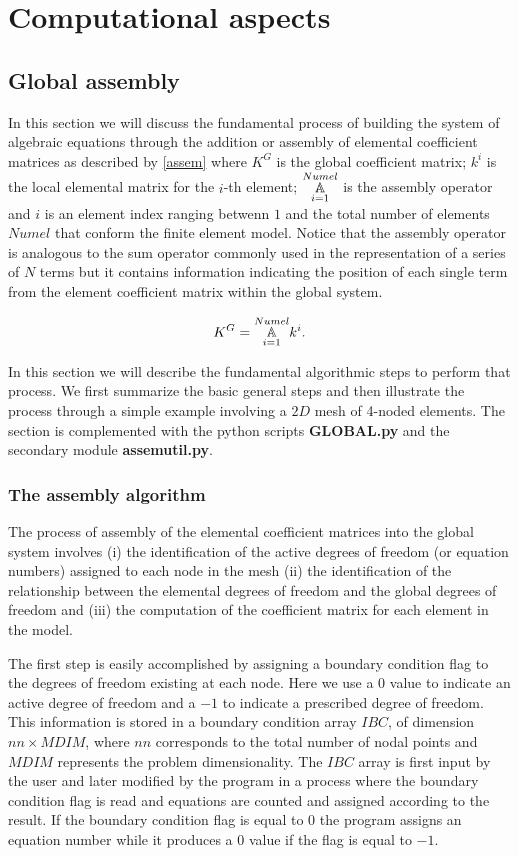 %
\graphicspath{ {./img/COMPU/} }
\chapter{Computational aspects}
\section{Global assembly}
In this section we will discuss the fundamental process of building the system of algebraic equations through the addition or assembly of elemental coefficient matrices as described by \cref{assem} where $K^G$ is the global coefficient matrix; $k^i$ is the local elemental matrix for the $i$-th element; $\assem{i=1}{Numel}$ is the assembly operator and $i$ is an element index ranging betwenn $1$ and the total number of elements $Numel$ that conform the finite element model. Notice that the assembly operator is analogous to the sum operator commonly used in the representation of a series of $N$ terms but it contains information indicating the position of each single term from the element coefficient matrix within the global system. 

\begin{equation}
{K^G}=\assem{i=1}{Numel} k^i.
\label{assem}
\end{equation}

In this section we will describe the fundamental algorithmic steps to perform that process. We first summarize the basic general steps and then illustrate the process through a simple example involving a $2D$ mesh of 4-noded elements. The section is complemented with the python scripts {\bf GLOBAL.py} and the secondary module {\bf assemutil.py}.

\subsection*{The assembly algorithm}
The process of assembly of the elemental coefficient matrices into the global system involves (i) the identification of the active degrees of freedom (or equation numbers) assigned to each node in the mesh (ii) the identification of the relationship between the elemental degrees of freedom and the global degrees of freedom and (iii) the computation of the coefficient matrix for each element in the model.

The first step is easily accomplished by assigning a boundary condition flag to the degrees of freedom existing at each node. Here we use a $0$ value to indicate an active degree of freedom and a $-1$ to indicate a prescribed degree of freedom. This information is stored in a boundary condition array $IBC$, of dimension $nn \times MDIM$, where $nn$ corresponds to the  total number of nodal points and $MDIM$ represents the problem dimensionality. The $IBC$ array is first input by the user and later modified by the program in a process where the boundary condition flag is read and equations are counted and assigned according to the result. If the boundary condition flag is equal to $0$ the program assigns an equation number while it produces a $0$ value if the flag is equal to $-1$.

